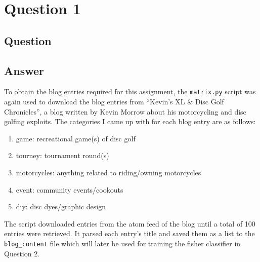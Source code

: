 \section{Question 1}

\subsection{Question}


\subsection{Answer}

To obtain the blog entries required for this assignment, the {\tt matrix.py} script was again used to download the blog entries from ``Kevin's XL \& Disc Golf Chronicles'', a blog written by Kevin Morrow about his motorcycling and disc golfing exploits. The categories I came up with for each blog entry are as follows:

\begin{enumerate}
	\item game: recreational game(s) of disc golf
	\item tourney: tournament round(s)
	\item motorcycles: anything related to riding/owning motorcycles
	\item event: community events/cookouts
	\item diy: disc dyes/graphic design
\end{enumerate}

\clearpage

The script downloaded entries from the atom feed \cite{atom} of the blog until a total of 100 entries were retrieved. It parsed each entry's title and saved them as a list to the {\tt blog\_content} file which will later be used for training the fisher classifier in Question 2.


